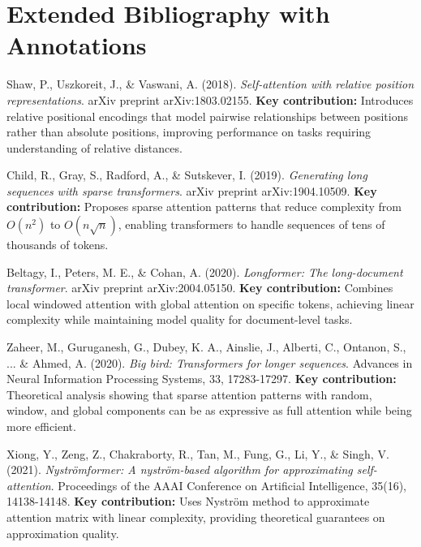 \section{Extended Bibliography with Annotations}

Shaw, P., Uszkoreit, J., \& Vaswani, A. (2018).
\textit{Self-attention with relative position representations}.
arXiv preprint arXiv:1803.02155.
\textbf{Key contribution:} Introduces relative positional encodings that model pairwise relationships between positions rather than absolute positions, improving performance on tasks requiring understanding of relative distances.

Child, R., Gray, S., Radford, A., \& Sutskever, I. (2019).
\textit{Generating long sequences with sparse transformers}.
arXiv preprint arXiv:1904.10509.
\textbf{Key contribution:} Proposes sparse attention patterns that reduce complexity from $O(n^2)$ to $O(n\sqrt{n})$, enabling transformers to handle sequences of tens of thousands of tokens.

Beltagy, I., Peters, M. E., \& Cohan, A. (2020).
\textit{Longformer: The long-document transformer}.
arXiv preprint arXiv:2004.05150.
\textbf{Key contribution:} Combines local windowed attention with global attention on specific tokens, achieving linear complexity while maintaining model quality for document-level tasks.

Zaheer, M., Guruganesh, G., Dubey, K. A., Ainslie, J., Alberti, C., Ontanon, S., ... \& Ahmed, A. (2020).
\textit{Big bird: Transformers for longer sequences}.
Advances in Neural Information Processing Systems, 33, 17283-17297.
\textbf{Key contribution:} Theoretical analysis showing that sparse attention patterns with random, window, and global components can be as expressive as full attention while being more efficient.

Xiong, Y., Zeng, Z., Chakraborty, R., Tan, M., Fung, G., Li, Y., \& Singh, V. (2021).
\textit{Nyströmformer: A nyström-based algorithm for approximating self-attention}.
Proceedings of the AAAI Conference on Artificial Intelligence, 35(16), 14138-14148.
\textbf{Key contribution:} Uses Nyström method to approximate attention matrix with linear complexity, providing theoretical guarantees on approximation quality.

